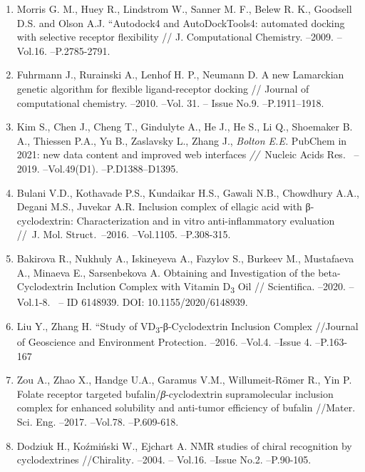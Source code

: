 \begin{enumerate}
\item
Morris G. M., Huey R., Lindstrom W., Sanner M. F., Belew R. K.,
Goodsell D.S. and Olson A.J. ``Autodock4 and AutoDockTools4: automated
docking with selective receptor flexibility // J. Computational
Chemistry. --2009. --Vol.16. --P.2785-2791.

\item
Fuhrmann J., Rurainski A., Lenhof H. P., Neumann D. A new Lamarckian
genetic algorithm for flexible ligand-receptor docking // Journal of
computational chemistry. --2010. --Vol. 31. -- Issue No.9.
--P.1911--1918.

\item
Kim S., Chen J., Cheng T., Gindulyte A., He J., He S., Li Q.,
Shoemaker B. A., Thiessen P.A., Yu B., Zaslavsky L., Zhang J.,
\emph{Bolton E.E.} PubChem in 2021: new data content and improved web
interfaces \emph{//~}Nucleic Acids Res.~ --2019. --Vol.49(D1).
--P.D1388--D1395.

\item
Bulani V.D., Kothavade P.S., Kundaikar H.S., Gawali N.B., Chowdhury
A.A., Degani M.S., Juvekar A.R. Inclusion complex of ellagic acid with
β-cyclodextrin: Characterization and in vitro anti-inflammatory
evaluation //~J. Mol. Struct\emph{.}~--2016. --Vol.1105. --P.308-315.

\item
Bakirova R., Nukhuly A., Iskineyeva A., Fazylov S., Burkeev M.,
Mustafaeva A., Minaeva E., Sarsenbekova A. Obtaining and Investigation
of the beta-Cyclodextrin Inclution Complex with Vitamin
D\textsubscript{3} Oil // Scientifica. --2020. --Vol.1-8. ~-- ID
6148939. DOI: 10.1155/2020/6148939.

\item
Liu Y., Zhang H. ``Study of VD\textsubscript{3}-β-Cyclodextrin
Inclusion Complex //Journal of Geoscience and Environment
Protection\emph{.} --2016. --Vol.4. --Issue 4. --P.163-167

\item
Zou A., Zhao X., Handge U.A., Garamus V.M., Willumeit-Römer R., Yin
P. Folate receptor targeted bufalin/\emph{β}-cyclodextrin supramolecular
inclusion complex for enhanced solubility and anti-tumor efficiency of
bufalin //Mater. Sci. Eng. --2017. --Vol.78. --P.609-618.

\item
Dodziuk H., Koźmiński W., Ejchart A. NMR studies of chiral
recognition by cyclodextrines //Chirality\emph{.} --2004. -- Vol.16.
--Issue No.2. --P.90-105.
\end{enumerate}

